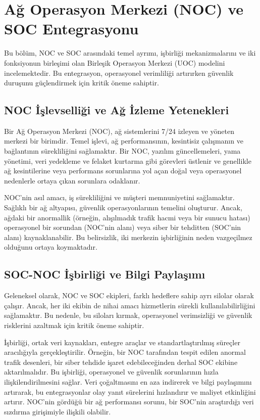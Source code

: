 \section{Ağ Operasyon Merkezi (NOC) ve SOC Entegrasyonu}

Bu bölüm, NOC ve SOC arasındaki temel ayrımı, işbirliği mekanizmalarını ve iki fonksiyonun birleşimi olan Birleşik Operasyon Merkezi (UOC) modelini incelemektedir. Bu entegrasyon, operasyonel verimliliği artırırken güvenlik duruşunu güçlendirmek için kritik öneme sahiptir.

\subsection{NOC İşlevselliği ve Ağ İzleme Yetenekleri}

Bir Ağ Operasyon Merkezi (NOC), ağ sistemlerini 7/24 izleyen ve yöneten merkezi bir birimdir. Temel işlevi, ağ performansının, kesintisiz çalışmanın ve bağlantının sürekliliğini sağlamaktır. Bir NOC, yazılım güncellemeleri, yama yönetimi, veri yedekleme ve felaket kurtarma gibi görevleri üstlenir ve genellikle ağ kesintilerine veya performans sorunlarına yol açan doğal veya operasyonel nedenlerle ortaya çıkan sorunlara odaklanır.

NOC'nin asıl amacı, iş sürekliliğini ve müşteri memnuniyetini sağlamaktır. Sağlıklı bir ağ altyapısı, güvenlik operasyonlarının temelini oluşturur. Ancak, ağdaki bir anormallik (örneğin, alışılmadık trafik hacmi veya bir sunucu hatası) operasyonel bir sorundan (NOC'nin alanı) veya siber bir tehditten (SOC'nin alanı) kaynaklanabilir. Bu belirsizlik, iki merkezin işbirliğinin neden vazgeçilmez olduğunu ortaya koymaktadır.

\subsection{SOC-NOC İşbirliği ve Bilgi Paylaşımı}

Geleneksel olarak, NOC ve SOC ekipleri, farklı hedeflere sahip ayrı silolar olarak çalışır. Ancak, her iki ekibin de nihai amacı hizmetlerin sürekli kullanılabilirliğini sağlamaktır. Bu nedenle, bu siloları kırmak, operasyonel verimsizliği ve güvenlik risklerini azaltmak için kritik öneme sahiptir.

İşbirliği, ortak veri kaynakları, entegre araçlar ve standartlaştırılmış süreçler aracılığıyla gerçekleştirilir. Örneğin, bir NOC tarafından tespit edilen anormal trafik desenleri, bir siber tehdide işaret edebileceğinden derhal SOC ekibine aktarılmalıdır. Bu işbirliği, operasyonel ve güvenlik sorunlarının hızla ilişkilendirilmesini sağlar. Veri çoğaltmasını en aza indirerek ve bilgi paylaşımını artırarak, bu entegrasyonlar olay yanıt sürelerini hızlandırır ve maliyet etkinliğini artırır. NOC'nin gördüğü bir ağ performansı sorunu, bir SOC'nin araştırdığı veri sızdırma girişimiyle ilişkili olabilir.

